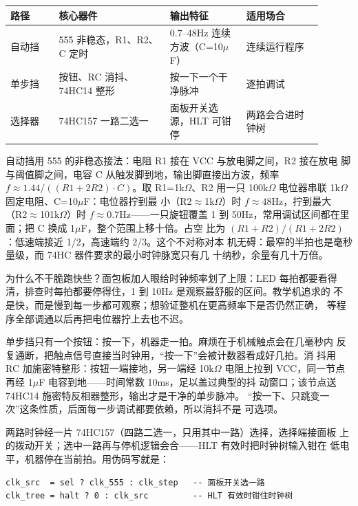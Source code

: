 \begin{longtable}{L{0.14\linewidth}L{0.32\linewidth}L{0.22\linewidth}L{0.22\linewidth}}
\toprule
路径 & 核心器件 & 输出特征 & 适用场合 \\
\midrule
自动挡 & 555 非稳态，R1、R2、C 定时 & 0.7--48Hz 连续方波（C=10$\mu$F） & 连续运行程序 \\\tablerowrule
单步挡 & 按钮、RC 消抖、74HC14 整形 & 按一下一个干净脉冲 & 逐拍调试 \\\tablerowrule
选择器 & 74HC157 一路二选一 & 面板开关选源，HLT 可钳停 & 两路会合进时钟树 \\
\bottomrule
\end{longtable}

自动挡用 555 的非稳态接法：电阻 R1 接在 VCC 与放电脚之间，R2 接在放电
脚与阈值脚之间，电容 C 从触发脚到地，输出脚直接出方波，频率
$f \approx 1.44/((R1+2R2)\cdot C)$。取 R1=1k$\Omega$、R2 用一只
100k$\Omega$ 电位器串联 1k$\Omega$ 固定电阻、C=10$\mu$F：电位器拧到最
小（R2$\approx$1k$\Omega$）时 $f \approx 48$Hz，拧到最大
（R2$\approx$101k$\Omega$）时 $f \approx 0.7$Hz——一只旋钮覆盖 1 到
50Hz，常用调试区间都在里面；把 C 换成 1$\mu$F，整个范围上移十倍。占空
比为 $(R1+R2)/(R1+2R2)$：低速端接近 1/2，高速端约 2/3。这个不对称对本
机无碍：最窄的半拍也是毫秒量级，而 74HC 器件要求的最小时钟脉宽只有几
十纳秒，余量有几十万倍。

为什么不干脆跑快些？面包板加人眼给时钟频率划了上限：LED 每拍都要看得
清，排查时每拍都要停得住，1 到 10Hz 是观察最舒服的区间。教学机追求的
不是快，而是慢到每一步都可观察；想验证整机在更高频率下是否仍然正确，
等程序全部调通以后再把电位器拧上去也不迟。

单步挡只有一个按钮：按一下，机器走一拍。麻烦在于机械触点会在几毫秒内
反复通断，把触点信号直接当时钟用，“按一下”会被计数器看成好几拍。消
抖用 RC 加施密特整形：按钮一端接地，另一端经 10k$\Omega$ 电阻上拉到
VCC，同一节点再经 1$\mu$F 电容到地——时间常数 10ms，足以盖过典型的抖
动窗口；该节点送 74HC14 施密特反相器整形，输出才是干净的单步脉冲。
“按一下、只跳变一次”这条性质，后面每一步调试都要依赖，所以消抖不是
可选项。

两路时钟经一片 74HC157（四路二选一，只用其中一路）选择，选择端接面板
上的拨动开关；选中一路再与停机逻辑会合——HLT 有效时把时钟树输入钳在
低电平，机器停在当前拍。用伪码写就是：

\begin{lstlisting}
clk_src  = sel ? clk_555 : clk_step   -- 面板开关选一路
clk_tree = halt ? 0 : clk_src         -- HLT 有效时钳住时钟树
\end{lstlisting}

